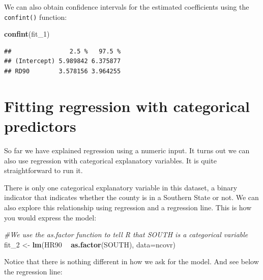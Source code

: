 \documentclass[]{book}
\newenvironment{Shaded}{\begin{snugshade}}{\end{snugshade}}
\newcommand{\CommentTok}[1]{\textcolor[rgb]{0.56,0.35,0.01}{\textit{#1}}}
\newcommand{\DataTypeTok}[1]{\textcolor[rgb]{0.13,0.29,0.53}{#1}}
\newcommand{\DecValTok}[1]{\textcolor[rgb]{0.00,0.00,0.81}{#1}}
\newcommand{\KeywordTok}[1]{\textcolor[rgb]{0.13,0.29,0.53}{\textbf{#1}}}
\newcommand{\NormalTok}[1]{#1}
\newcommand{\OperatorTok}[1]{\textcolor[rgb]{0.81,0.36,0.00}{\textbf{#1}}}
\newcommand{\StringTok}[1]{\textcolor[rgb]{0.31,0.60,0.02}{#1}}
\begin{document}
We can also obtain confidence intervals for the estimated coefficients using the \texttt{confint()} function:

\begin{Shaded}
\begin{Highlighting}[]
\KeywordTok{confint}\NormalTok{(fit_}\DecValTok{1}\NormalTok{)}
\end{Highlighting}
\end{Shaded}

\begin{verbatim}
##                2.5 %   97.5 %
## (Intercept) 5.989842 6.375877
## RD90        3.578156 3.964255
\end{verbatim}

\hypertarget{fitting-regression-with-categorical-predictors}{%
\section{Fitting regression with categorical predictors}\label{fitting-regression-with-categorical-predictors}}

So far we have explained regression using a numeric input. It turns out we can also use regression with categorical explanatory variables. It is quite straightforward to run it.

There is only one categorical explanatory variable in this dataset, a binary indicator that indicates whether the county is in a Southern State or not. We can also explore this relationship using regression and a regression line. This is how you would express the model:

\begin{Shaded}
\begin{Highlighting}[]
\CommentTok{#We use the as.factor function to tell R that SOUTH is a categorical variable}
\NormalTok{fit_}\DecValTok{2}\NormalTok{ <-}\StringTok{ }\KeywordTok{lm}\NormalTok{(HR90 }\OperatorTok{~}\StringTok{ }\KeywordTok{as.factor}\NormalTok{(SOUTH), }\DataTypeTok{data=}\NormalTok{ncovr)}
\end{Highlighting}
\end{Shaded}

Notice that there is nothing different in how we ask for the model. And see below the regression line:
\end{document}
